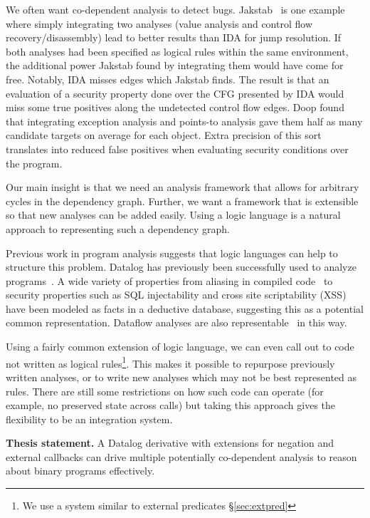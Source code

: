 We often want co-dependent analysis to detect bugs.
Jakstab~\cite{jakstab} is one example where simply integrating two analyses (value analysis and control flow recovery/disassembly) lead to better results than IDA\cite{ida} for jump resolution.
If both analyses had been specified as logical rules within the same environment, the additional power Jakstab found by integrating them would have come for free.
Notably, IDA misses edges which Jakstab finds.
The result is that an evaluation of a security property done over the CFG presented by IDA would miss some true positives along the undetected control flow edges.
Doop\cite{doop1} found that integrating exception analysis and points-to analysis gave them half as many candidate targets on average for each object.
Extra precision of this sort translates into reduced false positives when evaluating security conditions over the program.

Our main insight is that we need an analysis framework that allows for arbitrary cycles in the dependency graph.
Further, we want a framework that is extensible so that new analyses can be added easily.
Using a logic language is a natural approach to representing such a dependency graph.

Previous work in program analysis suggests that logic languages can help to structure this problem.
Datalog has previously been successfully used to analyze programs~\cite{lam2005,brumley2006,alpuente2011,doop1,bddbddb}.
A wide variety of properties from aliasing in compiled code~\cite{brumley2006} to security properties such as SQL injectability and cross site scriptability (XSS)~\cite{lam2005} have been modeled as facts in a deductive database, suggesting this as a potential common representation.
Dataflow analyses are also representable~\cite{mcallester2002} in this way.

Using a fairly common extension of logic language, we can even call out to code not written as logical rules\footnote{We use a system similar to external predicates \S\ref{sec:extpred}}.
This makes it possible to repurpose previously written analyses, or to write new analyses which may not be best represented as rules.
There are still some restrictions on how such code can operate (for example, no preserved state across calls) but taking this approach gives the flexibility to be an integration system.

\begin{inset}
{\bf Thesis statement.}
A Datalog derivative with extensions for negation and external callbacks can drive multiple potentially co-dependent analysis to reason about binary programs effectively.
\end{inset}

